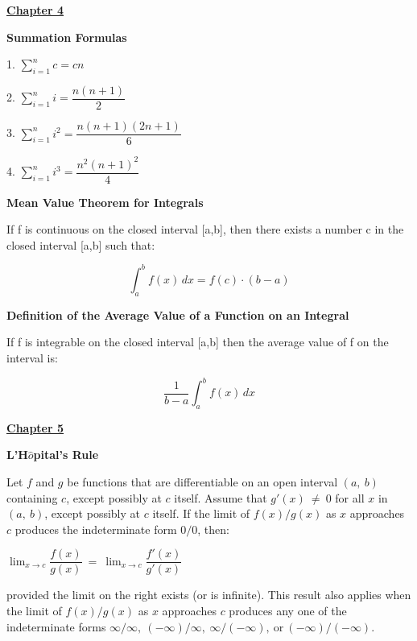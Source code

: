 \documentclass{article}
\begin{document}
\begin{large}
\vspace{0.25in}

\underline{\textbf{\huge Chapter 4 \phantom{ } \phantom{ } \phantom{ } \phantom{ }}}

\textbf{Summation Formulas}

1. $\sum\limits_{i=1}^{n} c = cn$  

2. $\sum\limits_{i=1}^{n} i = \dfrac{n(n+1)}{2}$  

3. $\sum\limits_{i=1}^{n} i^2 = \dfrac{n(n+1)(2n+1)}{6}$  

4. $\sum\limits_{i=1}^{n} i^3 = \dfrac{n^2(n+1)^2}{4}$

\vspace{0.2in}
\textbf{Mean Value Theorem for Integrals}

If f is continuous on the closed interval [a,b], then there exists a number c in the closed interval [a,b] such that:

\vspace{-0.3in}
\[\int_{a}^{b} f(x) \,dx=f(c) \cdot (b-a)\]

\textbf{Definition of the Average Value of a Function on an Integral}

If f is integrable on the closed interval [a,b] then the average value of f on the interval is:

\vspace{-0.5in}
\[\dfrac{1}{b-a}\int_{a}^{b} f(x) \,dx\]

\vspace{1.5in}
\underline{\textbf{\huge Chapter 5 \phantom{ } \phantom{ } \phantom{ } \phantom{ }}}

\textbf{L'H$\hat{o}$pital's Rule}

\vspace{-0.1in}
\hspace{0.1in} Let $f$ and $g$ be functions that are differentiable on an open interval $(a,\ b)$ containing $c$, except possibly at $c$ itself.  Assume that $g'(x)\ \neq\ 0$ for all $x$ in $(a,\ b)$, except possibly at $c$ itself.  If the limit of $f(x)/g(x)$ as $x$ approaches $c$ produces the indeterminate form $0/0$, then:

\hspace{0.2in} $\displaystyle\lim_{x\rightarrow c}\dfrac{f(x)}{g(x)}\ =\ \displaystyle\lim_{x\rightarrow c}\dfrac{f'(x)}{g'(x)}$

\hspace{0.1in} provided the limit on the right exists (or is infinite).  This result also applies when the limit of $f(x)/g(x)$ as $x$ approaches $c$ produces any one of the indeterminate forms $\infty/\infty,\ (-\infty)/\infty,\ \infty/(-\infty),\ \text{or}\ (-\infty)/(-\infty)$.


\end{large}
\end{document}
